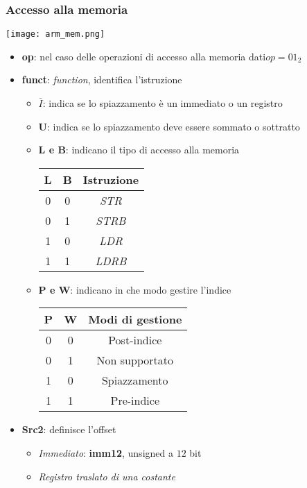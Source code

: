 \subsubsection{Accesso alla memoria}
\begin{center}
	\texttt{[image: arm\_mem.png]}
\end{center}
\begin{itemize}
	\item \textbf{op}: nel caso delle operazioni di accesso alla memoria dati$op = 01_2$
	\item \textbf{funct}: \textit{function}, identifica l'istruzione
	\begin{itemize}
		\item \textbf{$\bar{I}$}: indica se lo spiazzamento è un immediato o un registro
		\item \textbf{U}: indica se lo spiazzamento deve essere sommato o sottratto
		\item \textbf{L e B}: indicano il tipo di accesso alla memoria
		\begin{table}[!h]
			\centering
			\begin{tabular}{|c|c|c|}
				\hline
				\textbf{L} & \textbf{B} & \textbf{Istruzione}\\
				\hline
				0 & 0 & \textit{STR} \\
				0 & 1 & \textit{STRB}\\
				1 & 0 & \textit{LDR} \\
				1 & 1 & \textit{LDRB} \\
				\hline
			\end{tabular}
		\end{table}
		\item \textbf{P e W}: indicano in che modo gestire l'indice
		\begin{table}[!h]
			\centering
			\begin{tabular}{|c|c|c|}
				\hline
				\textbf{P} & \textbf{W} & \textbf{Modi di gestione}\\
				\hline
				0 & 0 & Post-indice \\
				0 & 1 & Non supportato \\
				1 & 0 & Spiazzamento \\
				1 & 1 & Pre-indice \\
				\hline
			\end{tabular}
		\end{table}
	\end{itemize}
	\item \textbf{Src2}: definisce l'offset
	\begin{itemize}
		\item \textit{Immediato}: \textbf{imm12}, unsigned a $12$ bit
		\item \textit{Registro traslato di una costante}
	\end{itemize}
\end{itemize}

